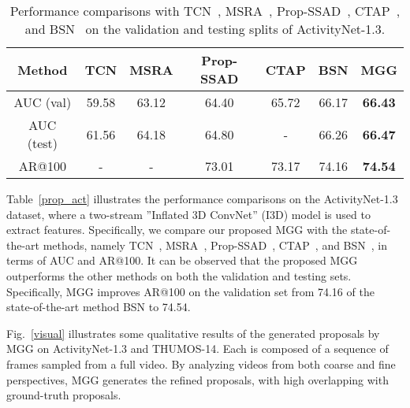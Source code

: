 \documentclass[10pt,twocolumn,letterpaper]{article}
\begin{document}
\begin{table}
\scriptsize \centering \caption{\label{prop_act} Performance comparisons with TCN~\cite{tcn}, MSRA~\cite{yao}, Prop-SSAD~\cite{lin2017}, CTAP~\cite{ctap}, and BSN~\cite{bsn} on the validation and testing splits of ActivityNet-1.3.}
\label{tab:tab2}
\begin{tabular}{c|c|c|c|c|c|c}
\toprule Method &TCN &MSRA & Prop-SSAD&CTAP &BSN& \textbf{MGG}\\\midrule
AUC (val) &59.58 &63.12 & 64.40& 65.72& 66.17&\textbf{66.43}\\
AUC (test) & 61.56& 64.18& 64.80& -& 66.26&\textbf{66.47}\\
AR@100&- & -& 73.01& 73.17&74.16 &\textbf{74.54}\\
\bottomrule
\end{tabular}
\end{table}


Table~\ref{prop_act} illustrates the performance comparisons on the ActivityNet-1.3 dataset, where a two-stream ”Inflated 3D ConvNet” (I3D) model \cite{i3d} is used to extract features. Specifically, we compare our proposed MGG with the state-of-the-art methods, namely TCN~\cite{tcn}, MSRA~\cite{yao}, Prop-SSAD~\cite{lin2017}, CTAP~\cite{ctap}, and BSN~\cite{bsn}, in terms of AUC and AR@100. It can be observed that the proposed MGG outperforms the other methods on both the validation and testing sets. Specifically, MGG improves AR@100 on the validation set from 74.16 of the state-of-the-art method BSN to 74.54.

Fig.~\ref{visual} illustrates some qualitative results of the generated proposals by MGG on ActivityNet-1.3 and THUMOS-14. Each is composed of  a sequence of frames sampled from a full video. By analyzing videos from both coarse and fine perspectives, MGG generates the refined proposals, with high overlapping with ground-truth proposals.
\end{document}
